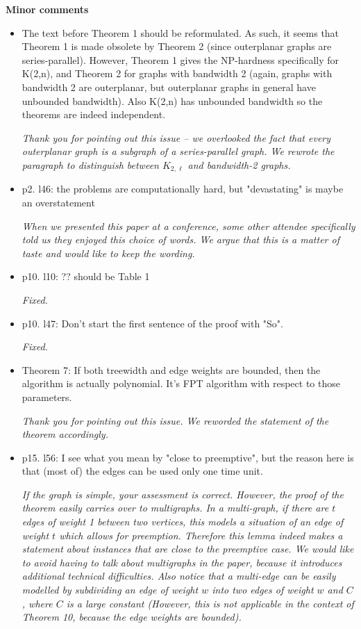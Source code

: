 \documentclass[11pt,a4paper]{article}
\begin{document}
\textbf{Minor comments}

\begin{itemize}

\item The text before Theorem 1 should be reformulated. As such, it seems that
Theorem 1 is made obsolete by Theorem 2 (since outerplanar graphs are
series-parallel).  However, Theorem 1 gives the NP-hardness specifically for
K(2,n), and Theorem 2 for graphs with bandwidth 2 (again, graphs with bandwidth
2 are outerplanar, but outerplanar graphs in general have unbounded bandwidth).
Also K(2,n) has unbounded bandwidth so the theorems are indeed independent.

\textit{Thank you for pointing out this issue -- we overlooked the fact that every outerplanar graph is a subgraph of a series-parallel graph. We rewrote the paragraph to distinguish between $K_{2,\ell}$ and bandwidth-2 graphs.}

\item p2.  l46: the problems are computationally hard, but "devastating" is maybe an overstatement
            
\textit{When we presented this paper at a conference, some other attendee specifically told us they enjoyed this choice of words. We argue that this is a matter of taste and would like to keep the wording.}            
            
\item p10. l10: ?? should be Table 1

\textit{Fixed.} 

\item p10. l47: Don't start the first sentence of the proof with "So".

\textit{Fixed.}

\item Theorem 7: If both treewidth and edge weights are bounded, then the algorithm
  is actually polynomial. It's FPT algorithm with respect to those parameters.
  
\textit{Thank you for pointing out this issue. We reworded the statement of the theorem accordingly.}
  
\item p15. l56: I see what you mean by "close to preemptive", but the reason here is 
  that (most of) the edges can be used only one time unit.
  
\textit{If the graph is simple, your assessment is correct. However, the proof of the theorem easily carries over to multigraphs. In a multi-graph, if there are $t$ edges of weight 1 between two vertices, this models a situation of an edge of weight $t$ which allows for preemption. Therefore this lemma indeed makes a statement about instances that are close to the preemptive case. We would like to avoid having to talk about multigraphs in the paper, because it introduces additional technical difficulties. Also notice that a multi-edge can be easily modelled by subdividing an edge of weight $w$ into two edges of weight $w$ and $C$, where $C$ is a large constant (However, this is not applicable in the context of Theorem 10, because the edge weights are bounded). }
  
\end{itemize}
\end{document}
